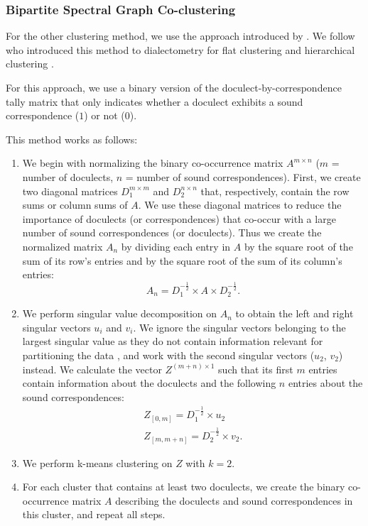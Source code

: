 \documentclass[a4paper]{article}
\begin{document}
\subsubsection{Bipartite Spectral Graph Co-clustering}
\label{subsubsec:bsgc}

For the other clustering method, we use the approach
introduced by \citet{dhillon2001co-clustering}.
We follow \citeauthor*{wieling2009bipartite} who introduced
this method to dialectometry for flat clustering \citeyearpar{wieling2009bipartite} and hierarchical clustering \citeyearpar{wieling2010hierarchical}.

For this approach, we use a binary version of the
doculect-by-correspondence tally matrix that only
indicates whether a doculect exhibits
a sound correspondence ($1$) or not ($0$).

This method works as follows:

\begin{enumerate}
\item 
We begin with normalizing the binary co-occurrence matrix
$A^{m \times n}$ ($m$ = number of doculects, $n$ = number of sound correspondences).
First, we create two diagonal matrices
$D_1^{m \times m}$ and $D_2^{n \times n}$ that, respectively,
contain the row sums or column sums of $A$.
We use these diagonal matrices to reduce
the importance of doculects (or correspondences)
that co-occur with a large number
of sound correspondences (or doculects).
Thus we create the normalized matrix $A_n$
by dividing each entry in $A$ by
the square root of the sum of its row's entries
and by the square root of the sum of its column's entries:
\begin{equation*}
A_n = D_1^{-\frac{1}{2}} \times A \times D_2^{-\frac{1}{2}}.
\end{equation*}

\item
{}
We perform singular value decomposition on $A_n$
to obtain the left and right singular vectors $u_i$ and $v_i$.
We ignore the singular vectors belonging
to the largest singular value as they do not contain
information relevant for partitioning the data \citep{kluger2003spectral},
and work with the second singular vectors ($u_2$, $v_2$) instead.
We calculate the vector $Z^{(m + n) \times 1}$ such that
its first $m$ entries contain information about the doculects
and the following $n$ entries about the sound correspondences:
\begin{align*}
Z_{[0, m]} = D_1^{-\frac{1}{2}} \times u_2\\
Z_{[m, m+n]} = D_2^{-\frac{1}{2}} \times v_2
.
\end{align*}

\item
{}
We perform k-means clustering on $Z$ with $k = 2$.

\item
For each cluster that contains at least two doculects,
we create the binary co-occurrence matrix $A$ describing
the doculects and sound correspondences in this cluster,
and repeat all steps.
\end{enumerate}
\end{document}
